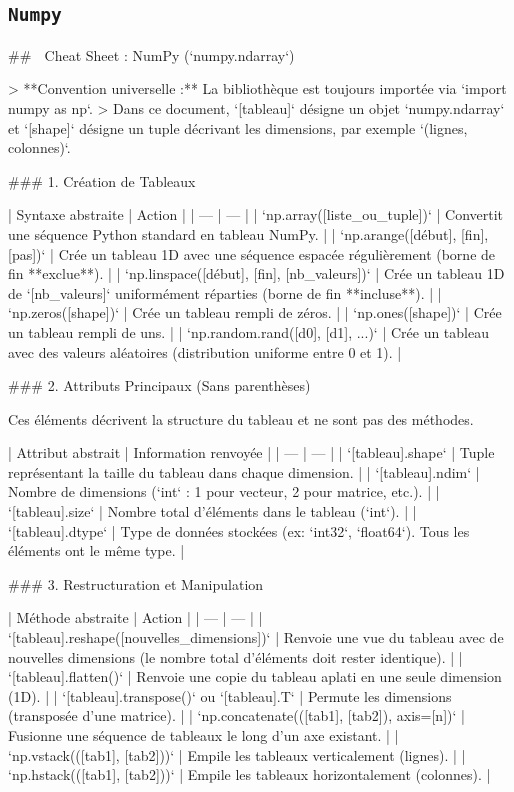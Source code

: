 \subsection{\texttt{Numpy}}

## 🐍 Cheat Sheet : NumPy (`numpy.ndarray`)

> **Convention universelle :** La bibliothèque est toujours importée via `import numpy as np`.
> Dans ce document, `[tableau]` désigne un objet `numpy.ndarray` et `[shape]` désigne un tuple décrivant les dimensions, par exemple `(lignes, colonnes)`.

### 1. Création de Tableaux

| Syntaxe abstraite | Action |
| --- | --- |
| `np.array([liste_ou_tuple])` | Convertit une séquence Python standard en tableau NumPy. |
| `np.arange([début], [fin], [pas])` | Crée un tableau 1D avec une séquence espacée régulièrement (borne de fin **exclue**). |
| `np.linspace([début], [fin], [nb_valeurs])` | Crée un tableau 1D de `[nb_valeurs]` uniformément réparties (borne de fin **incluse**). |
| `np.zeros([shape])` | Crée un tableau rempli de zéros. |
| `np.ones([shape])` | Crée un tableau rempli de uns. |
| `np.random.rand([d0], [d1], ...)` | Crée un tableau avec des valeurs aléatoires (distribution uniforme entre 0 et 1). |

### 2. Attributs Principaux (Sans parenthèses)

Ces éléments décrivent la structure du tableau et ne sont pas des méthodes.

| Attribut abstrait | Information renvoyée |
| --- | --- |
| `[tableau].shape` | Tuple représentant la taille du tableau dans chaque dimension. |
| `[tableau].ndim` | Nombre de dimensions (`int` : 1 pour vecteur, 2 pour matrice, etc.). |
| `[tableau].size` | Nombre total d'éléments dans le tableau (`int`). |
| `[tableau].dtype` | Type de données stockées (ex: `int32`, `float64`). Tous les éléments ont le même type. |

### 3. Restructuration et Manipulation

| Méthode abstraite | Action |
| --- | --- |
| `[tableau].reshape([nouvelles_dimensions])` | Renvoie une vue du tableau avec de nouvelles dimensions (le nombre total d'éléments doit rester identique). |
| `[tableau].flatten()` | Renvoie une copie du tableau aplati en une seule dimension (1D). |
| `[tableau].transpose()` ou `[tableau].T` | Permute les dimensions (transposée d'une matrice). |
| `np.concatenate(([tab1], [tab2]), axis=[n])` | Fusionne une séquence de tableaux le long d'un axe existant. |
| `np.vstack(([tab1], [tab2]))` | Empile les tableaux verticalement (lignes). |
| `np.hstack(([tab1], [tab2]))` | Empile les tableaux horizontalement (colonnes). |

